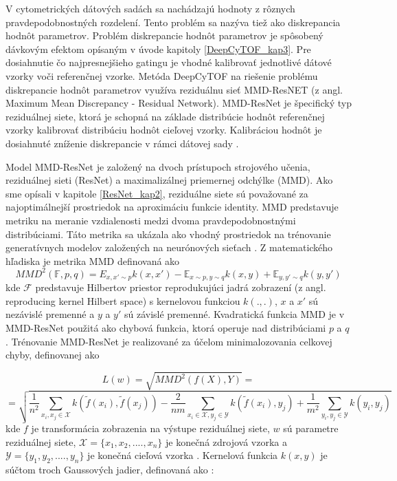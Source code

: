 V cytometrických dátových sadách sa nachádzajú hodnoty z rôznych pravdepodobnostných rozdelení. Tento problém sa nazýva tiež ako diskrepancia hodnôt parametrov. Problém diskrepancie hodnôt parametrov je spôsobený dávkovým efektom opísaným v úvode kapitoly \ref{DeepCyTOF_kap3}.
Pre dosiahnutie čo najpresnejšieho gatingu je vhodné kalibrovať jednotlivé dátové vzorky voči referenčnej vzorke. Metóda DeepCyTOF na riešenie problému diskrepancie hodnôt parametrov využíva reziduálnu sieť MMD-ResNET (z angl. Maximum Mean Discrepancy - Residual Network). MMD-ResNet je špecifický typ reziduálnej siete, ktorá je schopná na základe distribúcie hodnôt referenčnej vzorky kalibrovať distribúciu hodnôt cieľovej vzorky. Kalibráciou hodnôt je dosiahnuté zníženie diskrepancie v rámci dátovej sady \cite{Li2017}.

Model MMD-ResNet je založený na dvoch prístupoch strojového učenia, reziduálnej sieti (ResNet) a maximalizálnej priemernej odchýlke (MMD). Ako sme opísali v kapitole \ref{ResNet_kap2}, reziduálne siete sú považované za najoptimálnejší prostriedok na aproximáciu funkcie identity. MMD predstavuje metriku na meranie vzdialenosti medzi dvoma pravdepodobnostnými distribúciami. Táto metrika sa ukázala ako vhodný prostriedok na trénovanie generatívnych modelov založených na neurónových sieťach \cite{Li2017}. Z matematického hľadiska je metrika MMD definovaná ako
\begin{equation}
    MMD^2 (\mathbb{F},p,q)=\mathrm{}{E}_{x,x'\sim p}k(x,x') - \mathbb{E}_{x\sim p,y\sim q}k(x,y) + \mathbb{E}_{y,y'\sim q}k(y,y')
\end{equation}
kde $\mathcal{F}$ predstavuje Hilbertov priestor reprodukujúci jadrá zobrazení (z angl. reproducing kernel Hilbert space) s kernelovou funkciou $k(.,.)$, $x$ a $x'$ sú nezávislé premenné a $y$ a $y'$ sú závislé premenné. Kvadratická funkcia MMD je v MMD-ResNet použitá ako chybová funkcia, ktorá operuje nad distribúciami $p$ a $q$ \cite{Li2017}. Trénovanie MMD-ResNet je realizované za účelom minimalozovania celkovej chyby, definovanej ako

\begin{equation}
    L(w) = \sqrt{MMD^2(f(X), Y)} = 
\end{equation}
\[
= \sqrt{\frac{1}{n^2}\sum_{x_i, x_j \in \mathcal{X}}^{}{k(\tilde{f}(x_i),\tilde{f}(x_j))} - 
\frac{2}{nm}\sum_{x_i \in \mathcal{X}, y_j \in \mathcal{Y}}^{}{k(\tilde{f}(x_i),y_j)} +
\frac{1}{m^2}\sum_{y_i, y_j \in \mathcal{Y}}^{}{k(y_i,y_j)}
}
\]
kde $\tilde{f}$ je transformácia zobrazenia na výstupe reziduálnej siete, $w$ sú parametre reziduálnej siete, $\mathcal{X} = \{x_1, x_2, .... , x_n\}$ je konečná zdrojová vzorka a $\mathcal{Y} = \{y_1, y_2, .... , y_n\}$ je konečná cieľová vzorka \cite{Li2017}. Kernelová funkcia $k(x, y)$ je súčtom troch Gaussových jadier, definovaná ako \cite{Li2017}:

